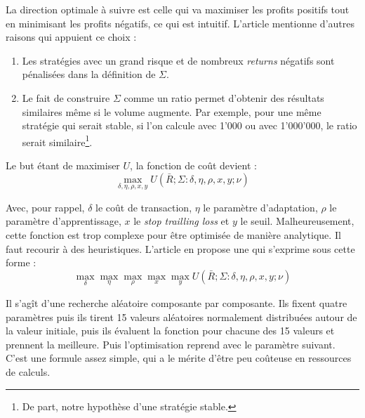 \documentclass[a4paper, 11pt]{article}
\begin{document}
La direction optimale à suivre est celle qui va maximiser les profits positifs tout en minimisant les profits négatifs, ce qui est intuitif.
L'article mentionne d'autres raisons qui appuient ce choix \cite{fx_trading}:
\begin{enumerate}
 \item Les stratégies avec un grand risque et de nombreux \textit{returns} négatifs sont pénalisées dans la définition de $\Sigma$.
 \item Le fait de construire $\Sigma$ comme un ratio permet d'obtenir des résultats similaires même si le volume augmente. Par exemple, pour une même
 stratégie qui serait stable, si l'on calcule avec 1'000 ou avec 1'000'000, le ratio serait similaire\footnote{De part, notre hypothèse d'une stratégie stable.}.
\end{enumerate}

Le but étant de maximiser $U$, la fonction de coût devient :
$$\max\limits_{\delta, \eta, \rho, x, y} U(\bar{R};\Sigma : \delta, \eta, \rho, x, y; \nu)$$

Avec, pour rappel, $\delta$ le coût de transaction, $\eta$ le paramètre d'adaptation, $\rho$ le paramètre d'apprentissage, $x$ le \textit{stop trailling
loss} et $y$ le seuil. Malheureusement, cette fonction est trop complexe pour être optimisée de manière analytique. Il faut recourir à des heuristiques.
L'article en propose une qui s'exprime sous cette forme :
$$\max\limits_{\delta} \max\limits_{\eta} \max\limits_{\rho} \max\limits_{x} \max\limits_{y} U(\bar{R};\Sigma : \delta, \eta, \rho, x, y; \nu)$$

Il s'agît d'une recherche aléatoire composante par composante. Ils fixent quatre paramètres puis ils tirent 15 valeurs aléatoires normalement distribuées
autour de la valeur initiale, puis ils évaluent la fonction pour chacune des 15 valeurs et prennent la meilleure. Puis l'optimisation reprend avec le 
paramètre suivant. C'est une formule assez simple, qui a le mérite d'être peu coûteuse en ressources de calculs.
\end{document}
